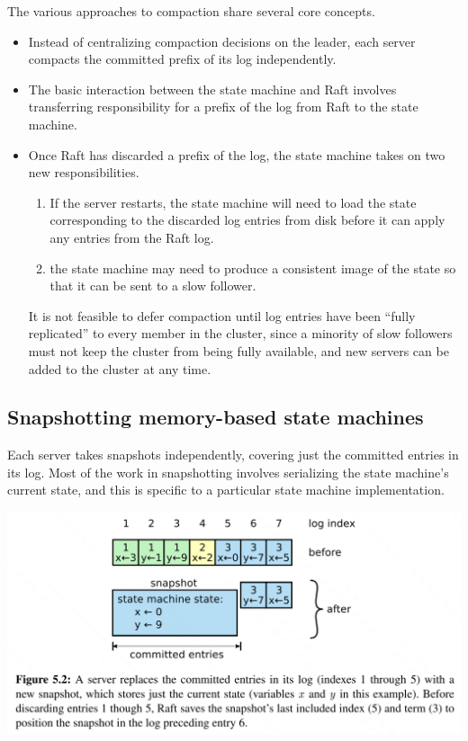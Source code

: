 \documentclass[11pt]{article}
\begin{document}
The various approaches to compaction share several core concepts.
\begin{itemize}
\item Instead of centralizing compaction decisions on the leader, each server compacts the committed
prefix of its log independently.
\item The basic interaction between the state machine and Raft involves transferring responsibility for a
prefix of the log from Raft to the state machine.
\item Once Raft has discarded a prefix of the log, the state machine takes on two new responsibilities.
\begin{enumerate}
\item If the server restarts, the state machine will need to load the state corresponding to the
discarded log entries from disk before it can apply any entries from the Raft log.
\item the state machine may need to produce a consistent image of the state so that it can be sent to a
slow follower.
\end{enumerate}
It is not feasible to defer compaction until log entries have been ``fully replicated'' to every
member in the cluster, since a minority of slow followers must not keep the cluster from being
fully available, and new servers can be added to the cluster at any time.
\end{itemize}
\subsection{Snapshotting memory-based state machines}
\label{sec:org3bdeac1}
Each server takes snapshots independently, covering just the committed entries in its log. Most of the
work in snapshotting involves serializing the state machine’s current state, and this is specific to a
particular state machine implementation. 
\begin{center}
\includegraphics[width=.99\textwidth]{../../images/papers/24.png}
\label{}
\end{center}
\end{document}
